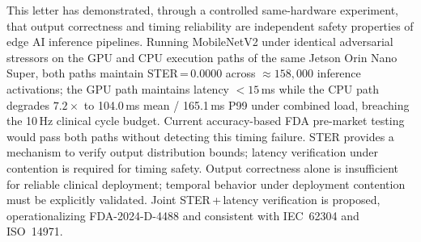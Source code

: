 \documentclass[journal,10pt,twocolumn]{IEEEtran}
\begin{document}
This letter has demonstrated, through a controlled same-hardware
experiment, that output correctness and timing reliability are
independent safety properties of edge AI inference pipelines.
Running MobileNetV2 under identical adversarial stressors on the GPU
and CPU execution paths of the same Jetson Orin Nano Super, both
paths maintain STER\,=\,0.0000 across ${\approx}158{,}000$ inference
activations; the GPU path maintains latency ${<}15$\,ms while the CPU
path degrades $7.2{\times}$ to 104.0\,ms mean / 165.1\,ms P99 under
combined load, breaching the 10\,Hz clinical cycle budget.
Current accuracy-based FDA pre-market testing would pass both paths
without detecting this timing failure.
STER provides a mechanism to verify output distribution bounds; latency
verification under contention is required for timing safety.
Output correctness alone is insufficient for reliable clinical deployment;
temporal behavior under deployment contention must be explicitly validated.
Joint STER\,+\,latency verification is proposed, operationalizing
FDA-2024-D-4488 and consistent with IEC~62304 and ISO~14971.


\end{document}
